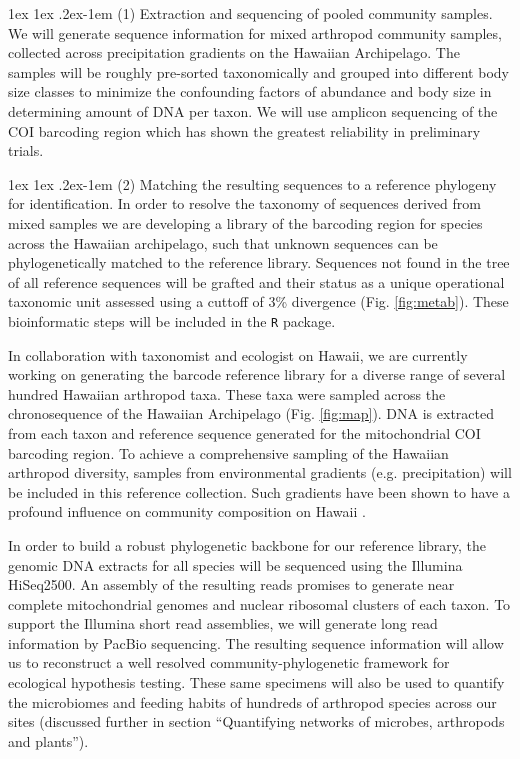 \documentclass[11pt]{article}
\makeatletter
\renewcommand{\paragraph}{\@startsection{paragraph}{4}{\z@}
  {1ex \@plus 1ex \@minus .2ex}{-1em}
  {\normalfont\normalsize\it}
}
\makeatother
\begin{document}
\paragraph{(1) Extraction and sequencing of pooled community samples.}
We will generate sequence information for mixed arthropod community
samples, collected across precipitation gradients on the Hawaiian
Archipelago. The samples will be roughly pre-sorted taxonomically and
grouped into different body size classes to minimize the confounding
factors of abundance and body size in determining amount of DNA per
taxon. We will use amplicon sequencing of the COI barcoding region
\citep{taberlet2012} which has shown the greatest reliability in
preliminary trials.


\paragraph{(2) Matching the resulting sequences to a reference
  phylogeny for identification.}
In order to resolve the taxonomy of sequences derived from mixed
samples we are developing a library of the barcoding region for
species across the Hawaiian archipelago, such that unknown sequences
can be phylogenetically matched to the reference library.
Sequences not found in the tree of all reference sequences will be
grafted and their status as a unique operational taxonomic unit
assessed using a cuttoff of 3\% divergence (Fig. \ref{fig:metab}).
These bioinformatic steps will be included in the {\tt R} package.

In collaboration with taxonomist and ecologist on Hawaii, we are
currently working on generating the barcode reference library for a
diverse range of several hundred Hawaiian arthropod taxa. These taxa
were sampled across the chronosequence of the Hawaiian Archipelago
(Fig. \ref{fig:map}). DNA is extracted from each taxon and reference
sequence generated for the mitochondrial COI barcoding region. To
achieve a comprehensive sampling of the Hawaiian arthropod diversity,
samples from environmental gradients (e.g. precipitation) will be
included in this reference collection. Such gradients have been shown
to have a profound influence on community composition on Hawaii
\citep{zimmerman2012}.

In order to build a robust phylogenetic backbone for our reference
library, the genomic DNA extracts for all species will be sequenced
using the Illumina HiSeq2500. An assembly of the resulting reads
promises to generate near complete mitochondrial genomes and nuclear
ribosomal clusters of each taxon. To support the Illumina short read
assemblies, we will generate long read information by PacBio
sequencing. The resulting sequence information will allow us to
reconstruct a well resolved community-phylogenetic framework for
ecological hypothesis testing.  These same specimens will also be used
to quantify the microbiomes and feeding habits of hundreds of
arthropod species across our sites (discussed further in section
``Quantifying networks of microbes, arthropods and plants'').
\end{document}
